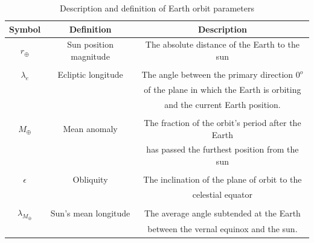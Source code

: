\begin{table}[h!t!b]
	\centering
	\caption{\label{table:SunOrbitParameters}Description and definition of Earth orbit parameters}
	\begin{tabular}{c c c}
		\hline\hline
		\textbf{Symbol} & \textbf{Definition} & \textbf{Description} \\ \hline
		$r_{\oplus}$ & Sun position magnitude & The absolute distance of the Earth to the sun \\ \\
 		$\lambda_e$ & Ecliptic longitude & The angle between the primary direction $0^o$ \\
		 &  & of the plane in which the Earth is orbiting \\
		 & & and the current Earth position. \\ \\
		$M_{\oplus}$ & Mean anomaly & The fraction of the orbit's period after the Earth \\
		 & & has passed the furthest position from the sun \\ \\
		$\epsilon$ & Obliquity & The inclination of the plane of orbit to the \\
		 & & celestial equator \\ \\
 		$\lambda_{M_{\oplus}}$ & Sun's mean longitude & The average angle subtended at the Earth \\
		 & & between the vernal equinox and the sun. \cite{ross1916sun} \\
		\hline\hline
	\end{tabular}
\end{table}

